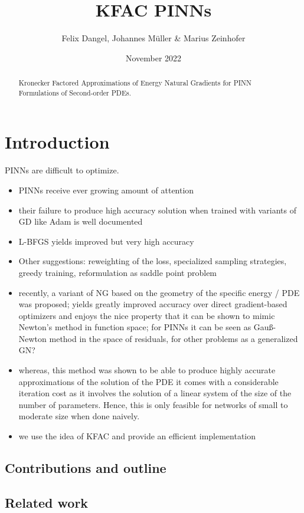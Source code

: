 \documentclass[11pt]{article}
\title{KFAC PINNs %
}
\date{November 2022}
\author{Felix Dangel, Johannes M\"uller \& Marius Zeinhofer}
\theoremstyle{definition}
\theoremstyle{plain}
\begin{document}
\maketitle

\begin{abstract}
Kronecker Factored Approximations of Energy Natural Gradients for PINN Formulations of Second-order PDEs.
\end{abstract}
\section{Introduction}
PINNs are difficult to optimize.
\begin{itemize}
    \item PINNs receive ever growing amount of attention 
    \item their failure to produce high accuracy solution when trained with variants of GD like Adam is well documented 
    \item L-BFGS yields improved but very high accuracy
    \item Other suggestions: reweighting of the loss, specialized sampling strategies, greedy training, reformulation as saddle point problem 
    \item recently, a variant of NG based on the geometry of the specific energy / PDE was proposed; yields greatly improved accuracy over direct gradient-based optimizers and enjoys the nice property that it can be shown to mimic Newton's method in function space; for PINNs it can be seen as Gau\ss-Newton method in the space of residuals, for other problems as a generalized GN? 
    \item whereas, this method was shown to be able to produce highly accurate approximations of the solution of the PDE it comes with a considerable iteration cost as it involves the solution of a linear system of the size of the number of parameters. Hence, this is only feasible for networks of small to moderate size when done naively.
    \item we use the idea of KFAC and provide an efficient implementation 
\end{itemize}

\subsection{Contributions and outline}

\subsection{Related work}
\end{document}
